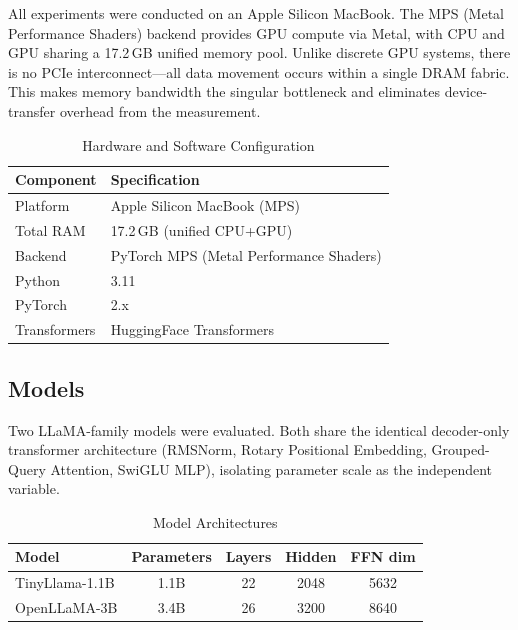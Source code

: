 \documentclass[conference]{IEEEtran}
\begin{document}
All experiments were conducted on an Apple Silicon MacBook. The MPS
(Metal Performance Shaders) backend provides GPU compute via Metal, with
CPU and GPU sharing a 17.2\,GB unified memory pool. Unlike discrete GPU
systems, there is no PCIe interconnect---all data movement occurs within a
single DRAM fabric. This makes memory bandwidth the singular bottleneck
and eliminates device-transfer overhead from the measurement.

\begin{table}[!t]
  \centering
  \caption{Hardware and Software Configuration}
  \label{tab:hw}
  \begin{tabular}{ll}
    \toprule
    \textbf{Component} & \textbf{Specification} \\
    \midrule
    Platform     & Apple Silicon MacBook (MPS) \\
    Total RAM    & 17.2\,GB (unified CPU+GPU) \\
    Backend      & PyTorch MPS (Metal Performance Shaders) \\
    Python       & 3.11 \\
    PyTorch      & 2.x \\
    Transformers & HuggingFace Transformers \\
    \bottomrule
  \end{tabular}
\end{table}

\subsection{Models}

Two LLaMA-family models were evaluated. Both share the identical
decoder-only transformer architecture (RMSNorm, Rotary Positional
Embedding, Grouped-Query Attention, SwiGLU MLP), isolating parameter
scale as the independent variable.

\begin{table}[!t]
  \centering
  \caption{Model Architectures}
  \label{tab:models}
  \begin{tabular}{lcccc}
    \toprule
    \textbf{Model} & \textbf{Parameters} & \textbf{Layers} & \textbf{Hidden} & \textbf{FFN dim} \\
    \midrule
    TinyLlama-1.1B & 1.1B & 22 & 2048 & 5632 \\
    OpenLLaMA-3B   & 3.4B & 26 & 3200 & 8640 \\
    \bottomrule
  \end{tabular}
\end{table}
\end{document}
